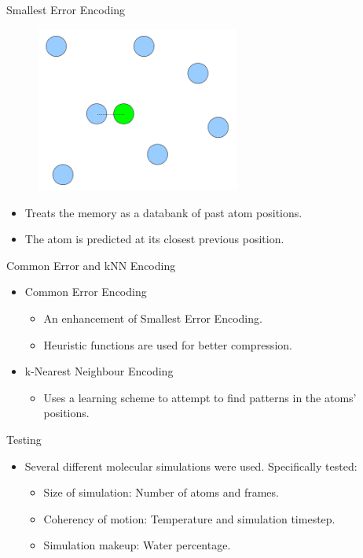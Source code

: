 \documentclass{beamer}
\begin{document}
\begin{frame}{Smallest Error Encoding}
\begin{figure}[h]
    \centering \includegraphics[width=0.6\textwidth]{julian-images/p3.png}
  \end{figure}
\begin{itemize}

 \item Treats the memory as a databank of past atom positions.

 \item The atom is predicted at its closest previous position.
\end{itemize}
\end{frame}

\begin{frame}{Common Error and kNN Encoding}

\begin{itemize}
 \item Common Error Encoding
\begin{itemize}
 \item An enhancement of Smallest Error Encoding.
 \item Heuristic functions are used for better compression.
\end{itemize}

\item k-Nearest Neighbour Encoding
\begin{itemize}
 \item Uses a learning scheme to attempt to find patterns in the atoms' positions.
\end{itemize}
\end{itemize}
\end{frame}

\begin{frame}{Testing}
\begin{itemize}
 \item Several different molecular simulations were used. Specifically tested:
 \begin{itemize}
   \item Size of simulation: Number of atoms and frames.
   \item Coherency of motion: Temperature and simulation timestep.
   \item Simulation makeup: Water percentage.
 \end{itemize}
 \end{itemize}
\end{frame}
\end{document}
